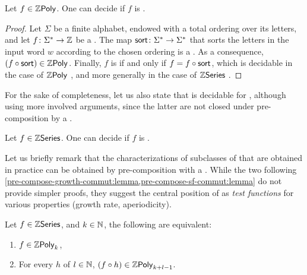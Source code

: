 \begin{lemma}
    \label{decide-commutative:lemma}
    Let $f \in \ZPoly$. One can decide if 
    $f$
    is .
\end{lemma}
\begin{proof}
    Let $\Sigma$ be a finite alphabet, endowed with a
    total ordering over its letters,
    and let $f \colon \Sigma^* \to \mathbb{Z}$ be a
    .
    The map $\mathsf{sort} \colon \Sigma^* \to \Sigma^*$
    that sorts the letters in the input word $w$ according
    to the chosen ordering is a 
    \cite[Proposition II.12]{LOPEZ23b}.
    As a consequence,
    $(f \circ \polysort) \in \ZPoly$.
    Finally, $f$ is  if and only
    if $f = f \circ \mathsf{sort}$, which is decidable
    in the case of $\ZPoly$
    \cite[Corollary II.24]{LOPEZ23b}, and more generally in the case 
    of $\mathbb{Z}\mathsf{Series}$ \cite[Corollary 3.6 p 38]{berstel2011noncommutative}.
\end{proof}


For the sake of completeness, let us also state that  is
decidable for , although using more involved
arguments, since the latter are not closed under pre-composition by a
.

\begin{lemma}
    \label{decidable-commutative-rat:lemma}
    Let $f \in \mathbb{Z}\mathsf{Series}$. One can decide if
    $f$ is .
\end{lemma}


Let us briefly remark that the characterizations of subclasses of
 that are obtained in practice can be obtained by
pre-composition with a  . While the
two following
\cref{pre-compose-growth-commut:lemma,pre-compose-sf-commut:lemma} do not
provide simpler proofs, they suggest the central position of 
 as \emph{test functions} for various
properties (growth rate, aperiodicity).

\begin{lemma}
    \label{pre-compose-growth-commut:lemma}
    Let $f \in \mathbb{Z}\mathsf{Series}$, and $k \in \mathbb{N}$,
    the following are equivalent:
    \begin{enumerate}
        \item $f \in \ZPoly[k]$,
        \item For every   $h$
            of  $l \in \mathbb{N}$,
            $(f \circ h) \in \ZPoly[k+l-1]$.
    \end{enumerate}
\end{lemma}


